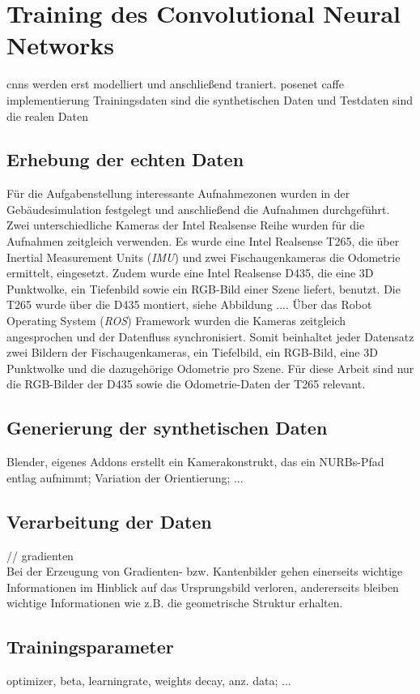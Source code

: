 
\section{Training des Convolutional Neural Networks}
cnns werden erst modelliert und anschließend traniert.
posenet caffe implementierung
Trainingsdaten sind die synthetischen Daten und Testdaten sind die realen Daten

\subsection{Erhebung der echten Daten}
Für die Aufgabenstellung interessante Aufnahmezonen wurden in der Gebäudesimulation festgelegt und anschließend die Aufnahmen durchgeführt. Zwei unterschiedliche Kameras der Intel Realsense Reihe wurden für die Aufnahmen zeitgleich verwenden. Es wurde eine Intel Realsense T265, die über Inertial Measurement Units (\textit{IMU}) und zwei Fischaugenkameras die Odometrie ermittelt, eingesetzt. Zudem wurde eine Intel Realsense D435, die eine 3D Punktwolke, ein Tiefenbild sowie ein RGB-Bild einer Szene liefert, benutzt. Die T265 wurde über die D435 montiert, siehe Abbildung .... Über das Robot Operating System (\textit{ROS}) Framework wurden die Kameras zeitgleich angesprochen und der Datenfluss synchronisiert. Somit beinhaltet jeder Datensatz zwei Bildern der Fischaugenkameras, ein Tiefelbild, ein RGB-Bild, eine 3D Punktwolke und die dazugehörige Odometrie pro Szene. Für diese Arbeit sind nur die RGB-Bilder der D435 sowie die Odometrie-Daten der T265 relevant.




\subsection{Generierung der synthetischen Daten}
Blender,
eigenes Addons erstellt ein Kamerakonstrukt, das ein NURBs-Pfad entlag aufnimmt; Variation der Orientierung; ...

\subsection{Verarbeitung der Daten}
// gradienten\\
Bei der Erzeugung von Gradienten- bzw. Kantenbilder gehen einerseits wichtige Informationen im Hinblick auf das Ursprungsbild verloren, andererseits bleiben wichtige Informationen wie z.B. die geometrische Struktur erhalten.

\subsection{Trainingsparameter}
optimizer, beta,
learningrate,
weights decay, anz. data; ...